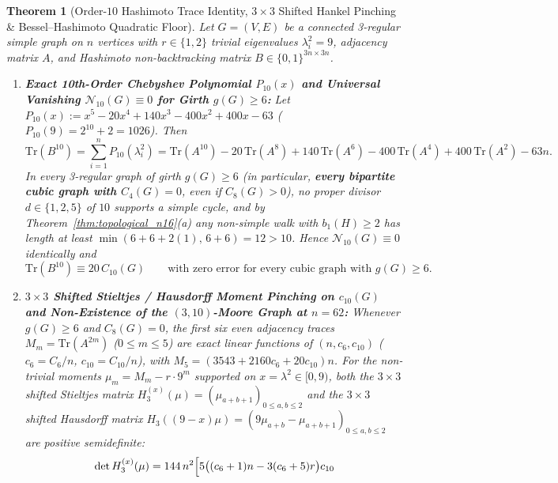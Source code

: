 \documentclass[10pt,a4paper]{article}
\newtheorem{theorem}{Theorem}[section]
\theoremstyle{definition}
\theoremstyle{remark}
\begin{document}
\begin{theorem}[Order-$10$ Hashimoto Trace Identity, $3 \times 3$ Shifted Hankel Pinching \& Bessel--Hashimoto Quadratic Floor]\label{thm:b10_hankel}
Let $G = (V, E)$ be a connected 3-regular simple graph on $n$ vertices with $r \in \{1, 2\}$ trivial eigenvalues $\lambda_i^2 = 9$, adjacency matrix $A$, and Hashimoto non-backtracking matrix $B \in \{0,1\}^{3n \times 3n}$.
\begin{enumerate}[label=(\alph*),nosep]
  \item \textbf{Exact 10th-Order Chebyshev Polynomial $P_{10}(x)$ and Universal Vanishing $\mathcal{N}_{10}(G) \equiv 0$ for Girth $g(G) \ge 6$:}
  Let $P_{10}(x) := x^5 - 20 x^4 + 140 x^3 - 400 x^2 + 400 x - 63$ ($P_{10}(9) = 2^{10}+2 = 1026$). Then
  \begin{equation}\label{eq:trb10}
    \mathrm{Tr}(B^{10}) = \sum_{i=1}^n P_{10}(\lambda_i^2) = \mathrm{Tr}(A^{10}) - 20\,\mathrm{Tr}(A^8) + 140\,\mathrm{Tr}(A^6) - 400\,\mathrm{Tr}(A^4) + 400\,\mathrm{Tr}(A^2) - 63n.
  \end{equation}
  In every 3-regular graph of girth $g(G) \ge 6$ (in particular, \textbf{every bipartite cubic graph with $C_4(G) = 0$}, even if $C_8(G) > 0$), no proper divisor $d \in \{1, 2, 5\}$ of $10$ supports a simple cycle, and by Theorem~\ref{thm:topological_n16}(a) any non-simple walk with $b_1(H) \ge 2$ has length at least $\min(6+6+2(1),\, 6+6) = 12 > 10$. Hence $\mathcal{N}_{10}(G) \equiv 0$ identically and
  \begin{equation}\label{eq:trb10_exact}
    \mathrm{Tr}(B^{10}) \equiv 20\,C_{10}(G) \qquad \text{with zero error for every cubic graph with } g(G) \ge 6.
  \end{equation}
  \item \textbf{$3 \times 3$ Shifted Stieltjes / Hausdorff Moment Pinching on $c_{10}(G)$ and Non-Existence of the $(3,10)$-Moore Graph at $n = 62$:}
  Whenever $g(G) \ge 6$ and $C_8(G) = 0$, the first six even adjacency traces $M_m = \mathrm{Tr}(A^{2m})$ ($0 \le m \le 5$) are exact linear functions of $(n, c_6, c_{10})$ ($c_6 = C_6/n$, $c_{10} = C_{10}/n$), with $M_5 = (3543 + 2160 c_6 + 20 c_{10}) n$. For the non-trivial moments $\mu_m = M_m - r \cdot 9^m$ supported on $x = \lambda^2 \in [0, 9)$, both the $3 \times 3$ shifted Stieltjes matrix $H_3^{(x)}(\mu) = (\mu_{a+b+1})_{0 \le a,b \le 2}$ and the $3 \times 3$ shifted Hausdorff matrix $H_3((9-x)\mu) = (9\mu_{a+b} - \mu_{a+b+1})_{0 \le a,b \le 2}$ are positive semidefinite:
  \begin{align}
    \det H_3^{(x)}(\mu) &= 144\,n^2 \Bigl[ 5\bigl((c_6 + 1) n - 3(c_6 + 5) r\bigr) c_{10} \nonumber\\

\end{align}
\end{enumerate}
\end{theorem}
\end{document}
